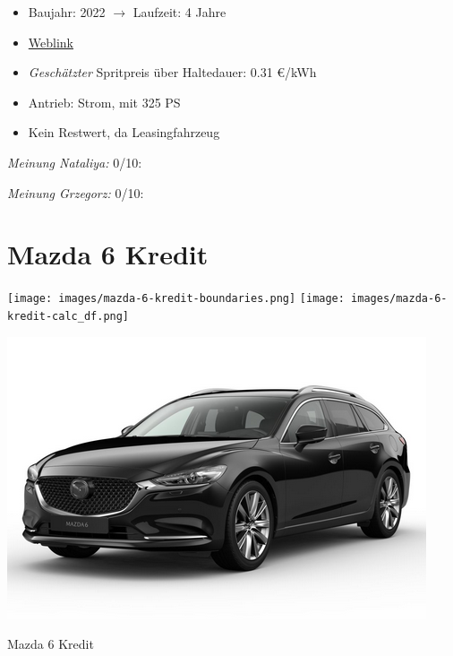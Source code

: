 \documentclass[landscape, DIV=99, 14pt]{scrartcl}
\begin{document}
\begin{itemize}
    \item Baujahr: 2022 $\rightarrow$ Laufzeit: 4 Jahre
    \item \href{https://www.tesla.com/de_de/model3/design\#overview}{Weblink}
    \item \emph{Gesch\"atzter} Spritpreis \"uber Haltedauer: 0.31 \euro{}/kWh
    \item Antrieb: Strom, mit 325 PS
    \item Kein Restwert, da Leasingfahrzeug
\end{itemize}

\begin{small}
\emph{Meinung Nataliya:} 0/10: 
        
\emph{Meinung Grzegorz:} 0/10: 
\end{small}

\pagebreak


\twocolumn

\section*{Mazda 6 Kredit}
\begin{center}
\texttt{[image: images/mazda-6-kredit-boundaries.png]}
\null
\vspace{0.5cm}
\texttt{[image: images/mazda-6-kredit-calc\_df.png]}
\end{center}

\pagebreak
\begin{center}
\includegraphics[width=0.9\columnwidth]{cars/mazda-6-neu.png}

Mazda 6 Kredit
\end{center}
\end{document}
